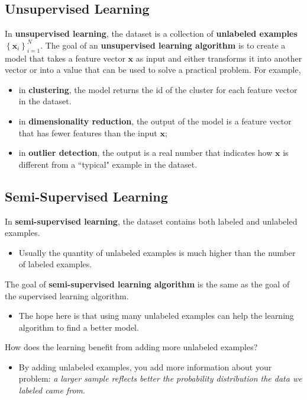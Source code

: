 \subsection{Unsupervised Learning}
In \textbf{unsupervised learning}, the dataset is a collection of \textbf{unlabeled examples} $\left\{\mathbf{x}_i\right\}_{i=1}^N$. The goal of an \textbf{unsupervised learning algorithm} is to create a model that takes a feature vector $\mathbf{x}$ as input and either transforms it into another vector or into a value that can be used to solve a practical problem. For example,
\begin{itemize}
	\item in \textbf{clustering}, the model returns the id of the cluster for each feature vector in the dataset.
	\item in \textbf{dimensionality reduction}, the output of the model is a feature vector that has fewer features than the input $\mathbf{x}$;
	\item in \textbf{outlier detection}, the output is a real number that indicates how $\mathbf{x}$ is different from a ``typical" example in the dataset.
\end{itemize}
\subsection{Semi-Supervised Learning}
In \textbf{semi-supervised learning}, the dataset contains both labeled and unlabeled examples.
\begin{itemize}
	\item Usually the quantity of unlabeled examples is much higher than the number of labeled examples.
\end{itemize}
The goal of \textbf{semi-supervised learning algorithm} is the same as the goal of the supervised learning algorithm.
\begin{itemize}
	\item The hope here is that using many unlabeled examples can help the learning algorithm to find a better model.
\end{itemize}
How does the learning benefit from adding more unlabeled examples?
\begin{itemize}
	\item By adding unlabeled examples, you add more information about your problem:\textit{ a larger sample reflects better the probability distribution the data we labeled came from}.
\end{itemize}

